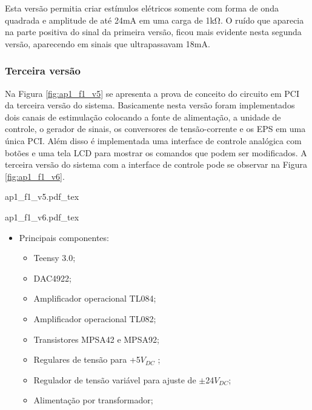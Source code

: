 Esta versão permitia criar estímulos elétricos somente com forma de onda quadrada e amplitude de até 24mA em uma carga de 1k$\mathrm{\Omega}$. O ruído que aparecia na parte positiva do sinal da primeira versão, ficou mais evidente nesta segunda versão, aparecendo em sinais que ultrapassavam 18mA. 

\subsubsection*{Terceira versão}
Na Figura \ref{fig:ap1_f1_v5} se apresenta a prova de conceito do circuito em \acrshort{PCI} da terceira versão do sistema. Basicamente nesta versão foram implementados dois canais de estimulação colocando a fonte de alimentação, a unidade de controle, o gerador de sinais, os conversores de tensão-corrente e os EPS em uma única \acrshort{PCI}. Além disso é implementada uma interface de controle analógica com botões e uma tela \acrshort{LCD} para mostrar os comandos que podem ser modificados. A terceira versão do sistema com a interface de controle pode se observar na Figura \ref{fig:ap1_f1_v6}.

\begin{figure*}[h]
    \centering %
    \small %
    \def\svgwidth{0.9\columnwidth}%
    {ap1_f1_v5.pdf_tex}
    \caption{PCI da terceira versão do sistema.}
    \label{fig:ap1_f1_v5}
\end{figure*}

\begin{figure*}[h]
    \centering %
    \small %
    \def\svgwidth{0.9\columnwidth}%
    {ap1_f1_v6.pdf_tex}
    \caption{Interface de controle analógica da terceira versão do sistema.}
    \label{fig:ap1_f1_v6}
\end{figure*}

\begin{itemize}
    \item Principais componentes:
    \begin{itemize}
        \item Teensy 3.0;
        \item DAC4922;
        \item Amplificador operacional TL084;
        \item Amplificador operacional TL082;
        \item Transistores MPSA42 e MPSA92;
        \item Regulares de tensão para +5$V_{DC}$ ;
        \item Regulador de tensão variável para ajuste de $\mathrm{\pm}$24$V_{DC}$;
        \item Alimentação por transformador;
    \end{itemize}
\end{itemize}

